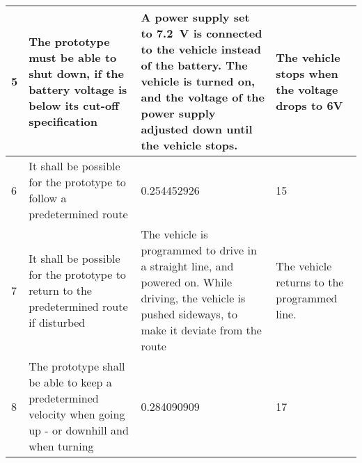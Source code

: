 \begin{table}[H]
\begin{tabular}{|p{2cm}|p{5cm}|p{6cm}|p{3cm}|}
\hline%
           5    &   The prototype must be able to shut down, if the battery voltage is below its cut-off specification &   A power supply set to \SI{7,2}{V} is connected to the vehicle instead of the battery. The vehicle is turned on, and the voltage of the power supply adjusted down until the vehicle stops.   &   The vehicle stops when the voltage drops to 6V               \\
\hline%
           6    &   It shall be possible for the prototype to follow a predetermined route &   0.254452926   &    15                \\
\hline%
           7    &   It shall be possible for the prototype to return to the predetermined route if disturbed   &  The vehicle is programmed to drive in a straight line, and powered on. While driving, the vehicle is pushed sideways, to make it deviate from the route    &   The vehicle returns to the programmed line.            \\ 
\hline%
           8    &   The prototype shall be able to keep a predetermined velocity when going up - or downhill and when turning   &   0.284090909   &    17             \\
\hline%
\end{tabular}
\label{tab:AcceptTestTestProcedure}
\end{table}

